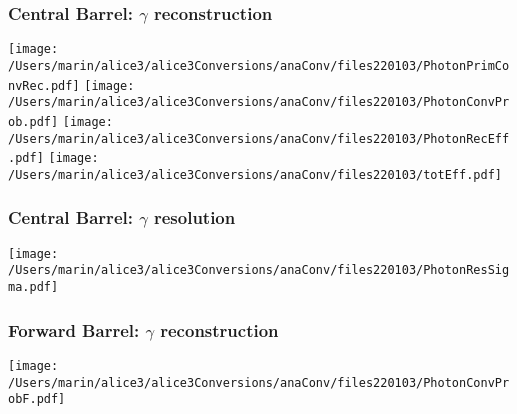 \documentclass[final,hyperref={pdfpagelabels=false},aspectratio=169,t]{beamer}
\begin{document}
\begin{frame}
\frametitle{Central Barrel: $\gamma$ reconstruction} 
\texttt{[image: /Users/marin/alice3/alice3Conversions/anaConv/files220103/PhotonPrimConvRec.pdf]}
\texttt{[image: /Users/marin/alice3/alice3Conversions/anaConv/files220103/PhotonConvProb.pdf]}
\texttt{[image: /Users/marin/alice3/alice3Conversions/anaConv/files220103/PhotonRecEff.pdf]}
\texttt{[image: /Users/marin/alice3/alice3Conversions/anaConv/files220103/totEff.pdf]}
\end{frame}

\begin{frame}
\frametitle{Central Barrel: $\gamma$ resolution} 


\texttt{[image: /Users/marin/alice3/alice3Conversions/anaConv/files220103/PhotonResSigma.pdf]}
\end{frame}

\begin{frame}
\frametitle{Forward Barrel: $\gamma$ reconstruction} 

\texttt{[image: /Users/marin/alice3/alice3Conversions/anaConv/files220103/PhotonConvProbF.pdf]}
\end{frame}
\end{document}
